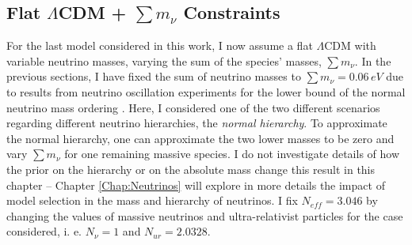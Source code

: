 \subsection{Flat $\Lambda$CDM + $\sum m_\nu$ Constraints}\label{Sec:nCDM}
For the last model considered in this work, I now assume a flat $\Lambda$CDM with variable neutrino masses, varying the sum of the species' masses, $\sum m_{\nu}$. In the previous sections, I have fixed the sum of neutrino masses to $\sum m_{\nu} = 0.06 \, eV$ due to results from neutrino oscillation experiments for the lower bound of the normal neutrino mass ordering \citep{2003HannestadNeutrino,2006NeutrinoReview,2016Hannestad}. Here, I considered one of the two different scenarios regarding different neutrino hierarchies, the \textit{normal hierarchy}.  To approximate the normal hierarchy, one can approximate the two lower masses to be zero and vary $\sum m_{\nu}$ for one remaining massive species. I do not investigate details of how the prior on the hierarchy or on the absolute mass change this result in this chapter  -- Chapter \ref{Chap:Neutrinos} will explore in more details the impact of model selection in the mass and hierarchy of neutrinos. I fix $N_{eff} = 3.046$ by changing the values of massive neutrinos and ultra-relativist particles for the case considered, i. e. $N_{\nu} = 1$ and $N_{ur} = 2.0328$.

